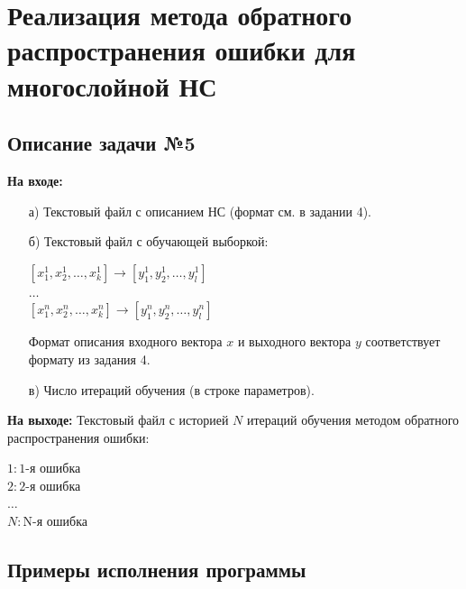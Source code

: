 \documentclass[bachelor, och, otchet]{template}
\begin{document}
        
    
\section{Реализация метода обратного распространения ошибки для многослойной НС}

    \subsection{Описание задачи №5}

        \textbf{На входе:}
        
            \begin{itemize}
                \item[а)] Текстовый файл с описанием НС (формат см. в задании 4).
                \item[б)] Текстовый файл с обучающей выборкой:
                
                    \begin{center}
                        $[x_{1}^{1}, x_{2}^1, \dots, x_{k}^1] \rightarrow [y_{1}^1, y_{2}^1, \dots, y_{l}^1]$ \\
                        $\dots$\\
                        $[x_{1}^n, x_{2}^n, \dots, x_{k}^n] \rightarrow [y_{1}^n, y_{2}^n, \dots, y_{l}^n]$ \\
                    \end{center}
                    Формат описания входного вектора $x$ и выходного вектора $y$ соответствует формату из задания 4. 
                \item[в)] Число итераций обучения (в строке параметров).

            \end{itemize}

        \textbf{На выходе:} Текстовый файл с историей $N$ итераций обучения методом обратного распространения ошибки:
            \begin{center}
                $1 : \text{1-я ошибка}$ \\
                $2 : \text{2-я ошибка}$ \\
                    $\dots$\\
                $N : \text{N-я ошибка}$ \\

            \end{center}

    \subsection{Примеры исполнения программы}
\end{document}
